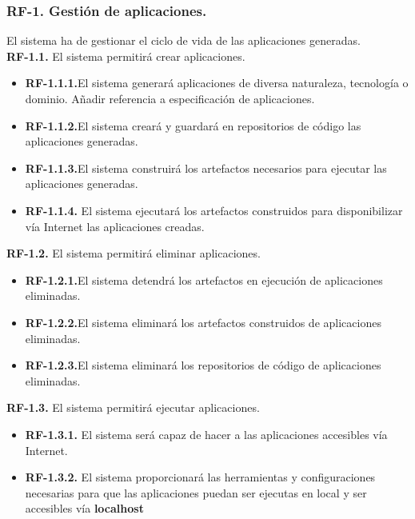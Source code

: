 \documentclass[a4paper,11pt]{book}
\begin{document}
\subsubsection { \textbf{ RF-1. Gestión de aplicaciones.}} El sistema ha de gestionar el ciclo de vida de las aplicaciones generadas.\\
   
\textbf{RF-1.1.} El sistema permitirá crear aplicaciones.
\begin{itemize}
 \item 	\textbf{RF-1.1.1.}El sistema generará aplicaciones de diversa naturaleza, tecnología o dominio. Añadir referencia a especificación de aplicaciones. 
 \item 	\textbf{RF-1.1.2.}El sistema creará y  guardará en repositorios de código las aplicaciones generadas.
  \item \textbf{RF-1.1.3.}El sistema construirá los artefactos necesarios para ejecutar las aplicaciones generadas.
   \item  \textbf{RF-1.1.4.} El sistema ejecutará los artefactos construidos para disponibilizar vía Internet las aplicaciones creadas. \\
\end{itemize}


\textbf{RF-1.2.} El sistema permitirá eliminar aplicaciones.
\begin{itemize}
 \item 	\textbf{RF-1.2.1.}El sistema detendrá los artefactos en ejecución de aplicaciones eliminadas. 
  \item 	\textbf{RF-1.2.2.}El sistema eliminará los artefactos construidos de aplicaciones eliminadas. 
   \item  \textbf{RF-1.2.3.}El sistema eliminará los repositorios de código de aplicaciones eliminadas.	\\
\end{itemize}

	
\textbf{RF-1.3.} El sistema permitirá ejecutar aplicaciones.
\begin{itemize}
 \item \textbf{RF-1.3.1.} El sistema será capaz de hacer a las aplicaciones accesibles vía Internet.  
 \item  \textbf{RF-1.3.2.} El sistema proporcionará las herramientas  y configuraciones necesarias para que las aplicaciones puedan ser ejecutas en local y ser accesibles vía \textbf{localhost}  \\
\end{itemize}
\end{document}
